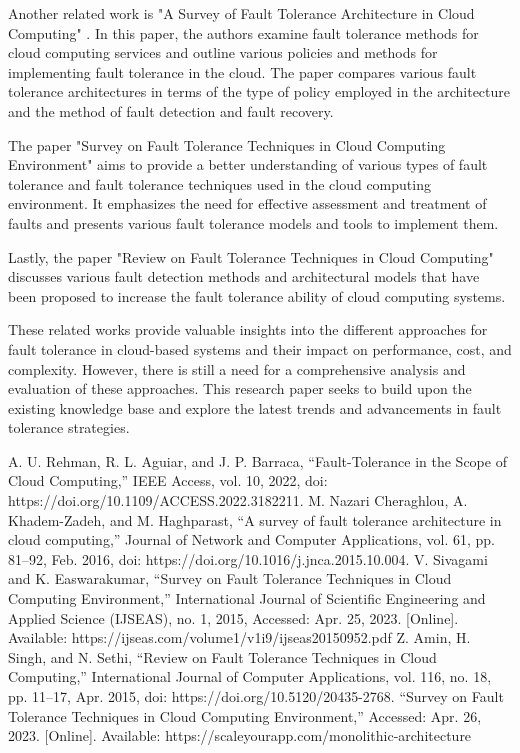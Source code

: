 \documentclass[lettersize,journal]{IEEEtran}
\begin{document}
Another related work is "A Survey of Fault Tolerance Architecture in Cloud Computing" \cite{paper_surveyArchitectures}. In this paper, the authors examine fault tolerance methods for cloud computing services and outline various policies and methods for implementing fault tolerance in the cloud. The paper compares various fault tolerance architectures in terms of the type of policy employed in the architecture and the method of fault detection and fault recovery.

The paper "Survey on Fault Tolerance Techniques in Cloud Computing Environment" \cite{paper_surveyTechniques} aims to provide a better understanding of various types of fault tolerance and fault tolerance techniques used in the cloud computing environment. It emphasizes the need for effective assessment and treatment of faults and presents various fault tolerance models and tools to implement them.

Lastly, the paper "Review on Fault Tolerance Techniques in Cloud Computing" \cite{paper_reviewTechniques} discusses various fault detection methods and architectural models that have been proposed to increase the fault tolerance ability of cloud computing systems. 

These related works provide valuable insights into the different approaches for fault tolerance in cloud-based systems and their impact on performance, cost, and complexity. However, there is still a need for a comprehensive analysis and evaluation of these approaches. This research paper seeks to build upon the existing knowledge base and explore the latest trends and advancements in fault tolerance strategies.

\begin{thebibliography}{1}


A. U. Rehman, R. L. Aguiar, and J. P. Barraca, “Fault-Tolerance in the Scope of Cloud Computing,” IEEE Access, vol. 10, 2022, doi: https://doi.org/10.1109/ACCESS.2022.3182211.
 M. Nazari Cheraghlou, A. Khadem-Zadeh, and M. Haghparast, “A survey of fault tolerance architecture in cloud computing,” Journal of Network and Computer Applications, vol. 61, pp. 81–92, Feb. 2016, doi: https://doi.org/10.1016/j.jnca.2015.10.004.
 V. Sivagami and K. Easwarakumar, “Survey on Fault Tolerance Techniques in Cloud Computing Environment,” International Journal of Scientific Engineering and Applied Science (IJSEAS), no. 1, 2015, Accessed: Apr. 25, 2023. [Online]. Available: https://ijseas.com/volume1/v1i9/ijseas20150952.pdf
 Z. Amin, H. Singh, and N. Sethi, “Review on Fault Tolerance Techniques in Cloud Computing,” International Journal of Computer Applications, vol. 116, no. 18, pp. 11–17, Apr. 2015, doi: https://doi.org/10.5120/20435-2768.
 “Survey on Fault Tolerance Techniques in Cloud Computing Environment,” Accessed: Apr. 26, 2023. [Online]. Available: https://scaleyourapp.com/monolithic-architecture

\end{thebibliography}

\newpage

\vfill
\end{document}
